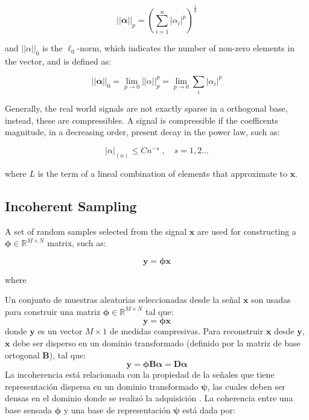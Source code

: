 \begin{equation}
||\boldsymbol{\alpha}||_p = \left(\sum\limits_{i=1}^{n} |\alpha_i|^p \right)^\frac{1}{p}
\end{equation}

and $||\alpha||_0$ is the $\ell_0$-norm, which indicates the number of
non-zero elements in the vector, and is defined as:

\begin{equation}
||\boldsymbol{\alpha}||_0 = \lim_{p \to 0} ||\alpha||_p^p=\lim_{p \to 0} \sum_i |\alpha_i|^p
\end{equation} 

Generally, the real world signals are not exactly sparse in a orthogonal base,
instead, these are compressibles. A signal is compressible if the
coefficents magnitude, in a decreasing order, present decay in the power law,
such as:

\begin{equation}
|\alpha|_{(n)} \leq C n^{-s}\;,\quad s=1,2 \ldots
\end{equation}

where $L$ is the term of a lineal combination of elements that approximate to
$\boldsymbol{x}$.

\subsection{Incoherent Sampling}

A set of random samples selected from the signal $\boldsymbol{x}$ are used for
constructing a $\boldsymbol{\phi} \in \mathbb{R}^{M \times N}$ matrix, such as:

\begin{equation}
\boldsymbol{y} = \boldsymbol{\phi x}
\end{equation}

where 

Un conjunto de muestras aleatorias seleccionadas desde la se\~nal $\boldsymbol{x}$ son usadas para construir una matriz $\boldsymbol{\phi} \in \mathbb{R}^{M \times N}$ tal que:
\begin{equation}
\boldsymbol{y} = \boldsymbol{\phi x}
\end{equation}
donde $\boldsymbol{y}$ es un vector $M\times 1$ de medidas compresivas.  Para reconstruir $\boldsymbol{x}$ desde $\boldsymbol{y}$, $\boldsymbol{x}$ debe ser disperso en un dominio transformado (definido por la matriz de base ortogonal $\boldsymbol{B}$), tal que:
\begin{equation}
\boldsymbol{y}=\boldsymbol{\phi B \alpha}= \boldsymbol{D\alpha}
\end{equation}
La incoherencia est\'a relacionada con la propiedad de la se\~nales que tiene representaci\'on dispersa en un dominio transformado $\boldsymbol{\psi}$, las cuales deben ser densas en el dominio donde se realiz\'o la adquisici\'on \cite{compressive}. La coherencia entre una base sensada $\boldsymbol{\phi}$  y una base de representaci\'on $\boldsymbol{\psi}$ est\'a dada por: 

